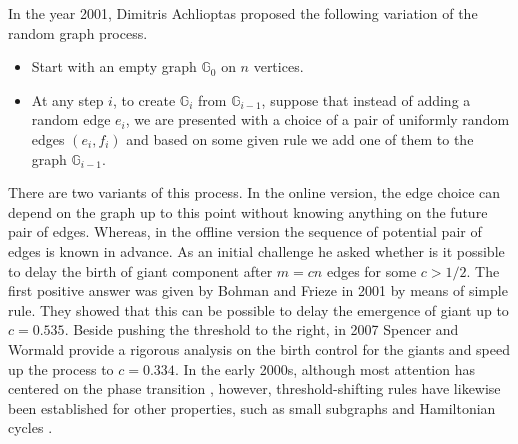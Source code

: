 \documentclass[11pt,reqno]{amsart}
\numberwithin{equation}{section}
\newcommand\GG{\mathbb{G}}
\begin{document}
	In the year 2001, Dimitris Achlioptas proposed the following variation of the random graph process.
	\begin{itemize}
		\renewcommand{\labelitemi}{\scriptsize$\blacksquare$}
		\item Start with an empty graph $\GG_0$ on $n$ vertices.
		\item At any step $i$, to create $\GG_{i}$ from $\GG_{i-1}$, suppose that instead of adding a random edge $e_i$, we are presented with a choice of a pair of uniformly random edges $\left(e_i,f_i\right)$ and based on some given rule we add one of them to the graph $\GG_{i-1}$.
	\end{itemize}
	There are two variants of this process.
	In the online version, the edge choice can depend on the graph up to this point without knowing anything on the future pair of edges.
	Whereas, in the offline version the sequence of potential pair of edges is known in advance.
	As an initial challenge he asked whether is it possible to delay the birth of giant component after $m=cn$ edges for some $c>1/2$.
	The first positive answer was given by Bohman and Frieze in 2001 \cite{BohmanFrieze} by means of simple rule.
	They showed that this can be possible to delay the emergence of giant up to $c=0.535$.
	Beside pushing the threshold to the right, in 2007 Spencer and Wormald \cite{SW} provide a rigorous analysis on the birth control for the giants and speed up the process to $c=0.334$.
	In the early 2000s, although most attention has centered on the phase transition \cite{BohmanKravitz,FGS,RW}, however, threshold-shifting rules have likewise been established for other properties, such as small subgraphs \cite{KLS,MST} and Hamiltonian cycles \cite{KLS}.
	
\end{document}
